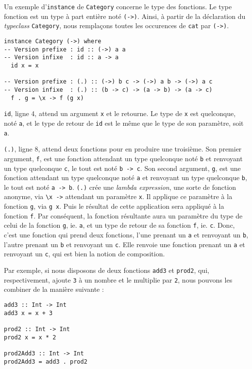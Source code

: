 \documentclass{llncs}
\begin{document}
Un exemple d'\lstinline{instance} de \lstinline{Category} concerne le type des fonctions.
Le type fonction est un type à part entière noté \lstinline{(->)}.
Ainsi, à partir de la déclaration du \emph{typeclass} \lstinline{Category}, nous
remplaçons toutes les occurences de \lstinline{cat} par \lstinline{(->)}.
\begin{lstlisting}
instance Category (->) where
-- Version prefixe : id :: (->) a a
-- Version infixe  : id :: a -> a
  id x = x

-- Version prefixe : (.) :: (->) b c -> (->) a b -> (->) a c
-- Version infixe  : (.) :: (b -> c) -> (a -> b) -> (a -> c)
  f . g = \x -> f (g x)
\end{lstlisting}

\lstinline{id}, ligne 4, attend un argument \lstinline{x} et le retourne.
Le type de \lstinline{x} est quelconque, noté \lstinline{a}, et le type de retour
de \lstinline{id} est le même que le type de son paramètre, soit \lstinline{a}.

\lstinline{(.)}, ligne 8, attend deux fonctions pour en produire une troisième.
Son premier argument, \lstinline{f}, est une fonction attendant un type quelconque
noté \lstinline{b} et renvoyant un type quelconque \lstinline{c}, le tout est
noté \lstinline{b -> c}.
Son second argument, \lstinline{g}, est une fonction attendant un type quelconque
noté \lstinline{a} et renvoyant un type quelconque \lstinline{b}, le tout est
noté \lstinline{a -> b}.
\lstinline{(.)} crée une \emph{lambda expression}, une sorte de fonction anonyme,
via \lstinline{\x ->} attendant un paramètre \lstinline{x}.
Il applique ce paramètre à la fonction \lstinline{g}, via \lstinline{g x}.
Puis le résultat de cette application sera appliqué à la fonction \lstinline{f}.
Par conséquent, la fonction résultante aura un paramètre du type de celui de la
fonction \lstinline{g}, ie. \lstinline{a}, et un type de retour de sa fonction \lstinline{f},
ie. \lstinline{c}.
Donc, c'est une fonction qui prend deux fonctions, l'une prenant un \lstinline{a}
et renvoyant un \lstinline{b}, l'autre prenant un \lstinline{b} et renvoyant un \lstinline{c}.
Elle renvoie une fonction prenant un \lstinline{a} et renvoyant un \lstinline{c},
qui est bien la notion de composition.

Par exemple, si nous disposons de deux fonctions \lstinline{add3} et \lstinline{prod2},
qui, respectivement, ajoute \lstinline{3} à un nombre et le multiplie par \lstinline{2},
nous pouvons les combiner de la manière suivante :
\begin{lstlisting}
add3 :: Int -> Int
add3 x = x + 3

prod2 :: Int -> Int
prod2 x = x * 2

prod2Add3 :: Int -> Int
prod2Add3 = add3 . prod2
\end{lstlisting}
\end{document}

